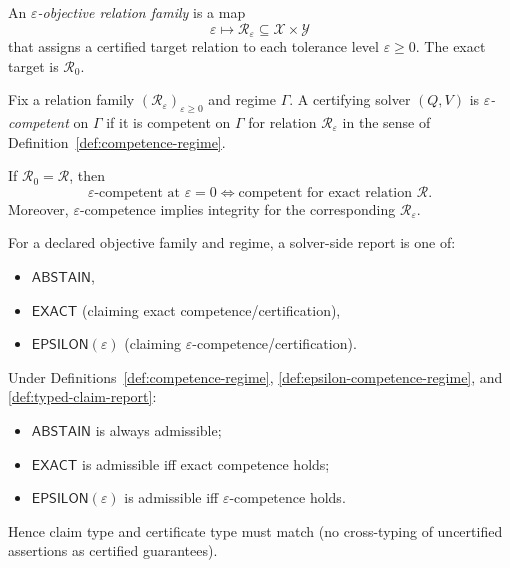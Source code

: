 \begin{definition}\label{def:epsilon-objective-family}
An \emph{$\varepsilon$-objective relation family} is a map
\[
\varepsilon \mapsto \mathcal{R}_\varepsilon \subseteq \mathcal{X}\times\mathcal{Y}
\]
that assigns a certified target relation to each tolerance level $\varepsilon\ge 0$.
The exact target is $\mathcal{R}_0$.
\end{definition}

\begin{definition}\label{def:epsilon-competence-regime}
Fix a relation family $(\mathcal{R}_\varepsilon)_{\varepsilon\ge 0}$ and regime $\Gamma$.
A certifying solver $(Q,V)$ is \emph{$\varepsilon$-competent} on $\Gamma$ if it is competent on $\Gamma$ for relation $\mathcal{R}_\varepsilon$ in the sense of Definition~\ref{def:competence-regime}.
\end{definition}

\begin{proposition}\label{prop:zero-epsilon-competence}
If $\mathcal{R}_0=\mathcal{R}$, then
\[
\text{$\varepsilon$-competent at }\varepsilon=0
\iff
\text{competent for exact relation }\mathcal{R}.
\]
Moreover, $\varepsilon$-competence implies integrity for the corresponding $\mathcal{R}_\varepsilon$.
\end{proposition}

\begin{definition}\label{def:typed-claim-report}
For a declared objective family and regime, a solver-side report is one of:
\begin{itemize}
\item $\mathsf{ABSTAIN}$,
\item $\mathsf{EXACT}$ (claiming exact competence/certification),
\item $\mathsf{EPSILON}(\varepsilon)$ (claiming $\varepsilon$-competence/certification).
\end{itemize}
\end{definition}

\begin{proposition}\label{prop:typed-claim-admissibility}
Under Definitions~\ref{def:competence-regime}, \ref{def:epsilon-competence-regime}, and \ref{def:typed-claim-report}:
\begin{itemize}
\item $\mathsf{ABSTAIN}$ is always admissible;
\item $\mathsf{EXACT}$ is admissible iff exact competence holds;
\item $\mathsf{EPSILON}(\varepsilon)$ is admissible iff $\varepsilon$-competence holds.
\end{itemize}
Hence claim type and certificate type must match (no cross-typing of uncertified assertions as certified guarantees).
\end{proposition}

